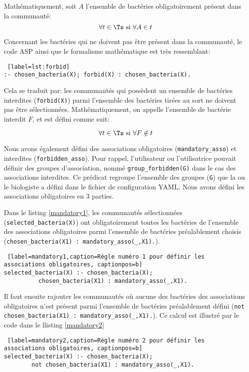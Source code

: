 \documentclass[../main.tex]{subfiles}
\begin{document}
Mathématiquement, soit $A$ l'ensemble de bactéries obligatoirement présent dans la communauté:
\[
\forall t \in \Ts \text{ si } \forall A \in t 
\]

Concernant les bactéries qui ne doivent pas être présent dans la communauté, le code ASP ainsi que le formalisme mathématique est très ressemblant:

\begin{lstlisting} [label=lst:forbid]
:- chosen_bacteria(X); forbid(X) : chosen_bacteria(X).
\end{lstlisting}

Cela se traduit par: les communautés qui possèdent un ensemble de bactéries interdites (\texttt{forbid(X)}) parmi l'ensemble des bactéries tirées au sort ne doivent pas être sélectionnées. Mathématiquement, on appelle l'ensemble de bactérie interdit $F$, et est défini comme suit:

\[
\forall t \in \Ts \text{ si } \forall F \not \in t 
\]

Nous avons également défini des associations obligatoires (\texttt{mandatory\_asso}) et interdites (\texttt{forbidden\_asso}). Pour rappel, l'utilisateur ou l'utilisatrice pouvait définir des groupes d'association, nommé \texttt{group\_forbidden(G)} dans le cas des associations interdites. Ce prédicat regroupe l'ensemble des groupes (\texttt{G}) que la ou le biologiste a défini dans le fichier de configuration YAML. Nous avons défini les associations obligatoires en 3 parties.

Dans le listing \ref{mandatory1}, les communautés sélectionnées (\texttt{selected\_bacteria(X)}) ont obligatoirement toutes les bactéries de l'ensemble des associations obligatoires parmi l'ensemble de bactéries préalablement choisis (\texttt{chosen\_bacteria(X1) : mandatory\_asso(\_,X1).}).

\begin{lstlisting} [label=mandatory1,caption=Règle numéro 1 pour définir les associations obligatoires, captionpos=b]
selected_bacteria(X) :- chosen_bacteria(X); 
		  chosen_bacteria(X1) : mandatory_asso(_,X1).
\end{lstlisting}

Il faut ensuite rajouter les communautés où aucune des bactéries des associations obligatoires n'est présent parmi l'ensemble de bactéries préalablement défini (\texttt{not chosen\_bacteria(X1) : mandatory\_asso(\_,X1).}). Ce calcul est illustré par le code dans le llisting \ref{mandatory2}

\begin{lstlisting} [label=mandatory2,caption=Règle numéro 2 pour définir les associations obligatoires, captionpos=b]
selected_bacteria(X) :- chosen_bacteria(X);
	    not chosen_bacteria(X1) : mandatory_asso(_,X1).
\end{lstlisting}
\end{document}
